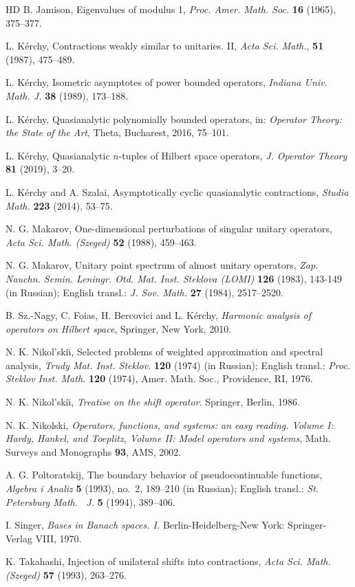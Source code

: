 \documentclass[a4paper,oneside,11pt]{amsart}
\numberwithin{equation}{section}
\theoremstyle{plain}
\theoremstyle{definition}
\begin{document}
\begin{thebibliography}{HD}
 B. Jamison, Eigenvalues of modulus 1,  \emph{Proc. Amer. Math. Soc.} {\bf 16} (1965), 375--377. 

 L. K\'erchy, 
Contractions weakly similar to unitaries. II,  
\emph{Acta Sci. Math.}, {\bf 51} (1987), 475--489. 

  L. K\'erchy, Isometric asymptotes of power bounded operators, 
     \emph{Indiana Univ. Math. J.} {\bf 38} (1989), 173--188. 

  L. K\'erchy,  Quasianalytic polynomially bounded operators,
in:  \emph{ Operator Theory: the State of the Art}, Theta, Bucharest, 2016, 75--101.

  L. K\'erchy, Quasianalytic $n$-tuples of Hilbert space operators, \emph{J. Operator Theory} 
{\bf 81} (2019), 3--20.

 L. K\'erchy and A. Szalai,  Asymptotically cyclic quasianalytic contractions, 
 \emph{Studia Math.} {\bf 223}  (2014), 53--75.

 N. G. Makarov, One-dimensional perturbations of singular unitary operators,  \emph{Acta Sci. Math. 
(Szeged)} {\bf 52} (1988), 459--463. 

 N. G. Makarov, Unitary point spectrum of almost unitary operators, 
\emph{Zap. Nauchn. Semin. Leningr. Otd. Mat. Inst. Steklova (LOMI)} {\bf 126} (1983), 143-149 (in Russian); 
 English transl.:  \emph{J. Sov. Math.} {\bf 27} (1984), 2517--2520.

 B. Sz.-Nagy,  C. Foias, H. Bercovici and L. K\'erchy, 
\emph{Harmonic analysis of operators on Hilbert space}, 
 Springer, New York, 2010. 

 N. K. Nikol'ski\u\i, Selected problems of weighted approximation and spectral analysis, 
\emph{Trudy Mat. Inst. Steklov.} {\bf 120} (1974) (in Russian); 
English transl.:   \emph{Proc. Steklov Inst. Math.} {\bf 120} (1974), Amer. Math. Soc., Providence, RI, 1976.

  N. K. Nikol'ski\u\i, \emph{Treatise on the shift operator}. Springer, Berlin, 1986.  

  N. K. Nikolski, \emph{Operators, functions, and systems: an easy reading.
 Volume I: Hardy, Hankel, and Toeplitz, Volume II: Model operators and systems}, Math. Surveys and Monographs 
{\bf 93}, AMS, 2002. 

 A. G. Poltoratskij, The boundary behavior of pseudocontinuable functions,  
 \emph{Algebra i Analiz} {\bf 5} (1993), no.~2, 189--210 (in Russian); 
English transl.:  \emph{St. Petersburg Math. ~J.} {\bf 5} (1994),  389--406.

 I. Singer, \emph{Bases in Banach spaces. I.} Berlin-Heidelberg-New York: Springer-Verlag VIII, 1970.


 K. Takahashi, Injection of unilateral shifts into 
           contractions, \emph{Acta Sci. Math. (Szeged)}  {\bf 57} (1993), 263--276.
\end{thebibliography}
\end{document}
